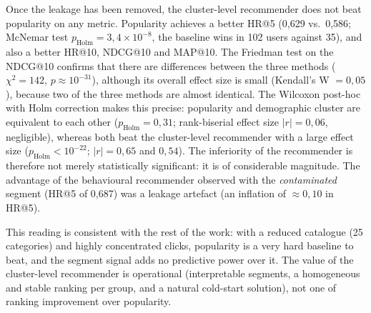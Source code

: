 Once the leakage has been removed, the cluster-level recommender does not beat popularity on any metric. Popularity achieves a better HR@5 (0,629 vs.\ 0,586; McNemar test $p_{\text{Holm}}=3{,}4\times10^{-8}$, the baseline wins in 102 users against 35), and also a better HR@10, NDCG@10 and MAP@10. The Friedman test on the NDCG@10 confirms that there are differences between the three methods ($\chi^2=142$, $p\approx10^{-31}$), although its overall effect size is small (Kendall's W $=0{,}05$), because two of the three methods are almost identical. The Wilcoxon post-hoc with Holm correction makes this precise: popularity and demographic cluster are equivalent to each other ($p_{\text{Holm}}=0{,}31$; rank-biserial effect size $|r|=0{,}06$, negligible), whereas both beat the cluster-level recommender with a large effect size ($p_{\text{Holm}}<10^{-22}$; $|r|=0{,}65$ and $0{,}54$). The inferiority of the recommender is therefore not merely statistically significant: it is of considerable magnitude. The advantage of the behavioural recommender observed with the \emph{contaminated} segment (HR@5 of 0,687) was a leakage artefact (an inflation of $\approx0{,}10$ in HR@5).

This reading is consistent with the rest of the work: with a reduced catalogue (25 categories) and highly concentrated clicks, popularity is a very hard baseline to beat, and the segment signal adds no predictive power over it. The value of the cluster-level recommender is operational (interpretable segments, a homogeneous and stable ranking per group, and a natural cold-start solution), not one of ranking improvement over popularity.

